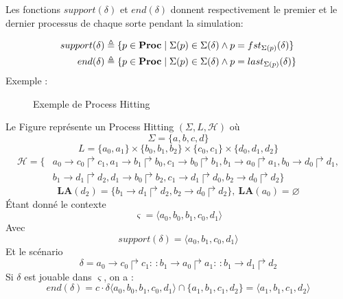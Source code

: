 \documentclass[11pt]{report}
\theoremstyle{definition}
\newcommand{\acm}[3]{#1\to#2\Rsh#3}
\begin{document}
Les fonctions $support(\delta)$ et $end(\delta)$ donnent respectivement le premier et le dernier processus de chaque sorte pendant la simulation:

\begin{equation}
\begin{aligned}
support(\delta)&\triangleq\{p\in {\bf Proc} \mid \Sigma(p)\in \Sigma(\delta)\land p= fst_{\Sigma(p)}  (\delta)\}\\
end(\delta)&\triangleq\{p\in{\bf Proc} \mid\Sigma(p)\in \Sigma(\delta)\land p= last_{\Sigma(p)}  (\delta)\}\nonumber
\end{aligned}
\end{equation}
Exemple : 
\begin{figure}[ht]
\centering
{}
\caption{Exemple de Process Hitting}\label{phex}
\end{figure}
Le Figure repr\'esente un Process Hitting $(\Sigma, L, \mathscr{H})$ o\`u 
$$\Sigma=\{a,b,c,d\}$$
$$L=\{a_0,a_1 \}\times\{b_0,b_1,b_2 \}\times\{c_0,c_1 \}\times\{d_0,d_1,d_2\}$$
\begin{align*}
\mathscr{H}=\{&\acm{a_0}{c_0}{c_1},\acm{a_1}{b_1}{b_0},\acm{c_1}{b_0}{b_1},\acm{b_1}{a_0}{a_1},\acm{b_0}{d_0}{d_1},\\
&\acm{b_1}{d_1}{d_2},\acm{d_1}{b_0}{b_2},\acm{c_1}{d_1}{d_0},\acm{b_2}{d_0}{d_2}\}
\end{align*}
$$\mathbf{LA}(d_2)=\{\acm{b_1}{d_1}{d_2}, \acm{b_2}{d_0}{d_2}\},\ \mathbf{LA}(a_0)=\varnothing$$
\'Etant donn\'e le contexte
$$\varsigma=\langle a_0,b_0,b_1,c_0,d_1\rangle$$
Avec
$$support(\delta)=\langle a_0,b_1,c_0,d_1\rangle$$
Et le sc\'enario
$$\delta=a_0\to c_0\Rsh c_1:\,:b_1\to a_0\Rsh a_1:\,:b_1\to d_1\Rsh d_2$$
Si $\delta$ est jouable dans $\varsigma$, on a :
$$end(\delta)=c\cdot\delta\langle a_0,b_0,b_1,c_0,d_1\rangle\cap\{a_1,b_1,c_1,d_2\}=\langle a_1,b_1,c_1,d_2\rangle$$
\end{document}
